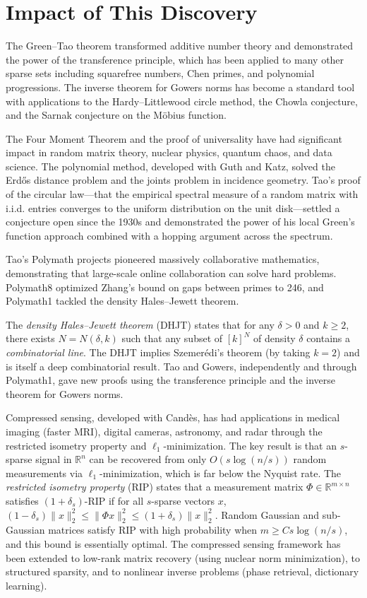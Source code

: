 \section{Impact of This Discovery}

The Green--Tao theorem \cite{greentao2008} transformed additive number theory and demonstrated the power of the transference principle, which has been applied to many other sparse sets including squarefree numbers, Chen primes, and polynomial progressions. The inverse theorem for Gowers norms has become a standard tool with applications to the Hardy--Littlewood circle method, the Chowla conjecture, and the Sarnak conjecture on the M\"obius function.

The Four Moment Theorem and the proof of universality have had significant impact in random matrix theory, nuclear physics, quantum chaos, and data science. The polynomial method, developed with Guth and Katz, solved the Erd\H{o}s distance problem and the joints problem in incidence geometry. Tao's proof of the circular law---that the empirical spectral measure of a random matrix with i.i.d. entries converges to the uniform distribution on the unit disk---settled a conjecture open since the 1930s and demonstrated the power of his local Green's function approach combined with a hopping argument across the spectrum.

Tao's Polymath projects pioneered massively collaborative mathematics, demonstrating that large-scale online collaboration can solve hard problems. Polymath8 optimized Zhang's bound on gaps between primes to 246, and Polymath1 tackled the density Hales--Jewett theorem.

The \emph{density Hales--Jewett theorem} (DHJT) states that for any $\delta > 0$ and $k \ge 2$, there exists $N = N(\delta, k)$ such that any subset of $[k]^N$ of density $\delta$ contains a \emph{combinatorial line}. The DHJT implies Szemer\'edi's theorem (by taking $k=2$) and is itself a deep combinatorial result. Tao and Gowers, independently and through Polymath1, gave new proofs using the transference principle and the inverse theorem for Gowers norms.

Compressed sensing, developed with Cand\`es, has had applications in medical imaging (faster MRI), digital cameras, astronomy, and radar through the restricted isometry property and $\ell_1$-minimization. The key result is that an $s$-sparse signal in $\mathbb{R}^n$ can be recovered from only $O(s \log(n/s))$ random measurements via $\ell_1$-minimization, which is far below the Nyquist rate. The \emph{restricted isometry property} (RIP) states that a measurement matrix $\Phi \in \mathbb{R}^{m \times n}$ satisfies $(1+\delta_s)$-RIP if for all $s$-sparse vectors $x$, $(1-\delta_s)\|x\|_2^2 \le \|\Phi x\|_2^2 \le (1+\delta_s)\|x\|_2^2$. Random Gaussian and sub-Gaussian matrices satisfy RIP with high probability when $m \ge C s \log(n/s)$, and this bound is essentially optimal. The compressed sensing framework has been extended to low-rank matrix recovery (using nuclear norm minimization), to structured sparsity, and to nonlinear inverse problems (phase retrieval, dictionary learning).

